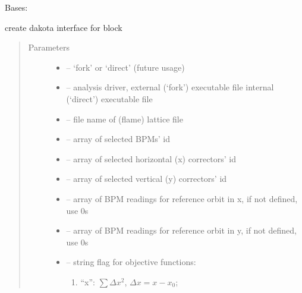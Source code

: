 \documentclass[letterpaper,10pt,english]{sphinxmanual}
\begin{document}

\begin{fulllineitems}
\label{\detokenize{src/apidocs/dakutils:genopt.dakutils.DakotaInterface}}
Bases: \href{https://docs.python.org/2/library/functions.html\#object}{}

create dakota interface for  block
\begin{quote}\begin{description}
\item[{Parameters}] \leavevmode\begin{itemize}
\item {} 
 -- `fork' or `direct' (future usage)

\item {} 
 -- analysis driver, external (`fork') executable file
internal (`direct') executable file

\item {} 
 -- file name of (flame) lattice file

\item {} 
 -- array of selected BPMs' id

\item {} 
 -- array of selected horizontal (x) correctors' id

\item {} 
 -- array of selected vertical (y) correctors' id

\item {} 
 -- array of BPM readings for reference orbit in x, if not defined, use 0s

\item {} 
 -- array of BPM readings for reference orbit in y, if not defined, use 0s

\item {} 
 -- 
string flag for objective functions:
\begin{enumerate}
\item {} 
``x'': \(\sum \Delta x^2\), \(\Delta x = x-x_0\);


\end{enumerate}
\end{itemize}
\end{description}
\end{quote}
\end{fulllineitems}
\end{document}

